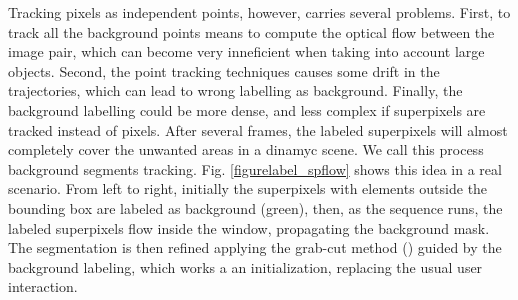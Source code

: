 
Tracking pixels as independent points, however, carries several problems. First, to track all the background points means to compute the optical flow between the image pair, which can become very inneficient 
when taking into account large objects. Second, the point tracking techniques causes some drift in the trajectories, which can lead to wrong labelling as background. Finally, the background labelling could be 
more dense, and less complex if superpixels are tracked instead of pixels.  After several frames, 
the labeled superpixels will almost completely cover the unwanted areas in a dinamyc scene. We call this process background segments tracking.  Fig. \ref{figurelabel_spflow} shows this idea in a real scenario. From left to right, initially the superpixels with elements outside the bounding box are labeled as background (green), then, as the sequence runs, the labeled superpixels flow inside the window, propagating the background mask. 
The segmentation is then refined  applying the grab-cut method (\cite{c18}\cite{c15}) guided by the background labeling, which works a an initialization, replacing the usual user interaction.

